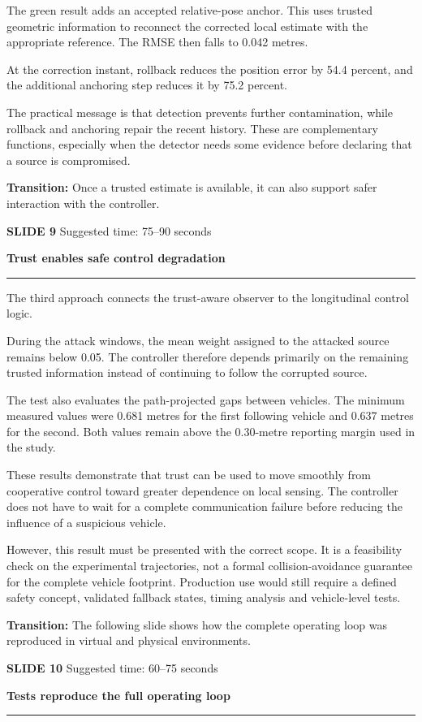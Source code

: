 \documentclass[11pt,a4paper]{article}
\newcommand{\slidetitle}[3]{%
  \clearpage
  {\color{Accent}\large\bfseries SLIDE #1}\hfill
  {\color{Muted}\small Suggested time: #3}\par
  \vspace{0.18cm}
  {\LARGE\bfseries #2}\par
  \vspace{0.20cm}
  {\color{Muted}\rule{\textwidth}{0.5pt}}\par
  \vspace{0.12cm}
}
\newcommand{\transition}[1]{%
  \vfill
  \colorbox{Panel}{%
    \parbox{\dimexpr\textwidth-2\fboxsep\relax}{%
      \raggedright\textbf{Transition:} #1}}
}
\begin{document}
The green result adds an accepted relative-pose anchor. This uses trusted geometric information to reconnect the corrected local estimate with the appropriate reference. The RMSE then falls to 0.042 metres.

At the correction instant, rollback reduces the position error by 54.4 percent, and the additional anchoring step reduces it by 75.2 percent.

The practical message is that detection prevents further contamination, while rollback and anchoring repair the recent history. These are complementary functions, especially when the detector needs some evidence before declaring that a source is compromised.

\transition{Once a trusted estimate is available, it can also support safer interaction with the controller.}

\slidetitle{9}{Trust enables safe control degradation}{75--90 seconds}

The third approach connects the trust-aware observer to the longitudinal control logic.

During the attack windows, the mean weight assigned to the attacked source remains below 0.05. The controller therefore depends primarily on the remaining trusted information instead of continuing to follow the corrupted source.

The test also evaluates the path-projected gaps between vehicles. The minimum measured values were 0.681 metres for the first following vehicle and 0.637 metres for the second. Both values remain above the 0.30-metre reporting margin used in the study.

These results demonstrate that trust can be used to move smoothly from cooperative control toward greater dependence on local sensing. The controller does not have to wait for a complete communication failure before reducing the influence of a suspicious vehicle.

However, this result must be presented with the correct scope. It is a feasibility check on the experimental trajectories, not a formal collision-avoidance guarantee for the complete vehicle footprint. Production use would still require a defined safety concept, validated fallback states, timing analysis and vehicle-level tests.

\transition{The following slide shows how the complete operating loop was reproduced in virtual and physical environments.}

\slidetitle{10}{Tests reproduce the full operating loop}{60--75 seconds}
\end{document}
